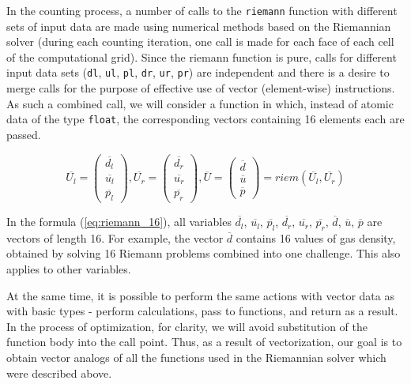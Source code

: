 \documentclass[utf8,english]{psta}%
\begin{document}
In the counting process, a number of calls to the \texttt{riemann} function with different sets of input data are made using numerical methods based on the Riemannian solver (during each counting iteration, one call is made for each face of each cell of the computational grid).
Since the riemann function is pure, calls for different input data sets (\texttt{dl}, \texttt{ul}, \texttt{pl}, \texttt{dr}, \texttt{ur}, \texttt{pr}) are independent and there is a desire to merge calls for the purpose of effective use of vector (element-wise) instructions.
As such a combined call, we will consider a function in which, instead of atomic data of the type \texttt{float}, the corresponding vectors containing 16 elements each are passed.

\begin{equation}\label{eq:riemann_16}
\overline{U_l} = \left( \begin{array}{ccc} \overline{d_l} \\ \overline{u_l} \\ \overline{p_l} \end{array} \right),
\overline{U_r} = \left( \begin{array}{ccc} \overline{d_r} \\ \overline{u_r} \\ \overline{p_r} \end{array} \right),
\overline{U} = \left( \begin{array}{ccc} \overline{d} \\ \overline{u} \\ \overline{p} \end{array} \right) = riem(\overline{U_l}, \overline{U_r})
\end{equation}

In the formula (\ref{eq:riemann_16}), all variables $\overline{d_l}$, $\overline{u_l}$, $\overline{p_l}$, $\overline{d_r}$, $\overline{u_r}$, $\overline{p_r}$, $\overline{d}$, $\overline{u}$, $\overline{p}$ are vectors of length 16.
For example, the vector $\overline{d}$ contains 16 values of gas density, obtained by solving 16 Riemann problems combined into one challenge.
This also applies to other variables.

At the same time, it is possible to perform the same actions with vector data as with basic types - perform calculations, pass to functions, and return as a result.
In the process of optimization, for clarity, we will avoid substitution of the function body into the call point.
Thus, as a result of vectorization, our goal is to obtain vector analogs of all the functions used in the Riemannian solver which were described above.
\end{document}
